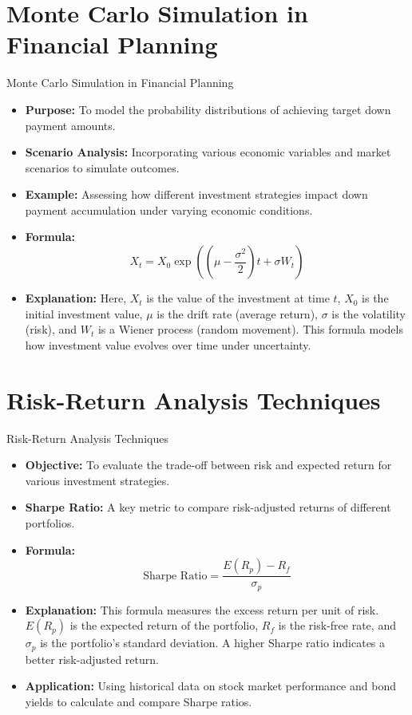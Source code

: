 \documentclass{beamer}
\begin{document}
\section{Monte Carlo Simulation in Financial Planning}
\begin{frame}{Monte Carlo Simulation in Financial Planning}
    \begin{itemize}
        \item \textbf{Purpose:} To model the probability distributions of achieving target down payment amounts.
        \item \textbf{Scenario Analysis:} Incorporating various economic variables and market scenarios to simulate outcomes.
        \item \textbf{Example:} Assessing how different investment strategies impact down payment accumulation under varying economic conditions.
        \item \textbf{Formula:}
        \begin{equation*}
            X_t = X_0 \exp \left( \left( \mu - \frac{\sigma^2}{2} \right)t + \sigma W_t \right)
        \end{equation*}
        \item \textbf{Explanation:} Here, \( X_t \) is the value of the investment at time \( t \), \( X_0 \) is the initial investment value, \( \mu \) is the drift rate (average return), \( \sigma \) is the volatility (risk), and \( W_t \) is a Wiener process (random movement). This formula models how investment value evolves over time under uncertainty.
    \end{itemize}
\end{frame}

\section{Risk-Return Analysis Techniques}
\begin{frame}{Risk-Return Analysis Techniques}
    \begin{itemize}
        \item \textbf{Objective:} To evaluate the trade-off between risk and expected return for various investment strategies.
        \item \textbf{Sharpe Ratio:} A key metric to compare risk-adjusted returns of different portfolios.
        \item \textbf{Formula:}
        \begin{equation*}
            \text{Sharpe Ratio} = \frac{E(R_p) - R_f}{\sigma_p}
        \end{equation*}
        \item \textbf{Explanation:} This formula measures the excess return per unit of risk. \( E(R_p) \) is the expected return of the portfolio, \( R_f \) is the risk-free rate, and \( \sigma_p \) is the portfolio's standard deviation. A higher Sharpe ratio indicates a better risk-adjusted return.
        \item \textbf{Application:} Using historical data on stock market performance and bond yields to calculate and compare Sharpe ratios.
    \end{itemize}
\end{frame}
\end{document}
